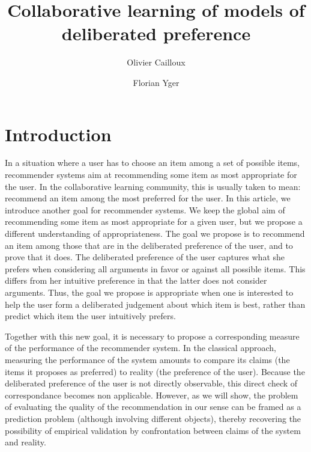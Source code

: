 \documentclass[french, english]{da2pl2018}
\begin{document}
\title{%
	Collaborative learning of models of deliberated preference%
}
\author{Olivier Cailloux}
\author{Florian Yger}
\makeatletter
\makeatother
\maketitle

\section{Introduction}
In a situation where a user has to choose an item among a set of possible items, recommender systems aim at recommending some item as most appropriate for the user.
In the collaborative learning community, this is usually taken to mean: recommend an item among the most preferred for the user. In this article, we introduce another goal for recommender systems. We keep the global aim of recommending some item as most appropriate for a given user, but we propose a different understanding of appropriateness. The goal we propose is to recommend an item among those that are in the deliberated preference of the user, and to prove that it does. The deliberated preference of the user captures what she prefers when considering all arguments in favor or against all possible items. This differs from her intuitive preference in that the latter does not consider arguments. Thus, the goal we propose is appropriate when one is interested to help the user form a deliberated judgement about which item is best, rather than predict which item the user intuitively prefers.

Together with this new goal, it is necessary to propose a corresponding measure of the performance of the recommender system. In the classical approach, measuring the performance of the system amounts to compare its claims (the items it proposes as preferred) to reality (the preference of the user). Because the deliberated preference of the user is not directly observable, this direct check of correspondance becomes non applicable. However, as we will show, the problem of evaluating the quality of the recommendation in our sense can be framed as a prediction problem (although involving different objects), thereby recovering the possibility of empirical validation by confrontation between claims of the system and reality.
\end{document}
